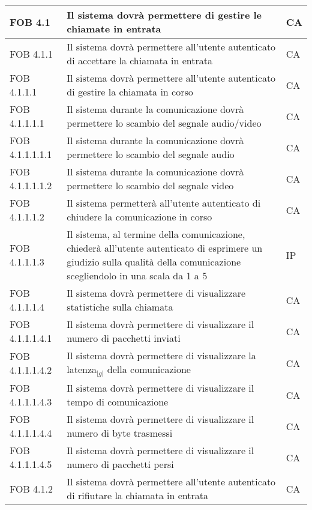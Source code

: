 \begin{longtable}{p{} p{} p{} }
\midrule
FOB 4.1 & Il sistema dovrà permettere di gestire le chiamate in entrata & CA\\

\midrule
FOB 4.1.1 & Il sistema dovrà permettere all'utente autenticato di accettare la chiamata in entrata & CA\\
\midrule
FOB 4.1.1.1 & Il sistema dovrà permettere all'utente autenticato di gestire la chiamata in corso & CA\\

\midrule
FOB 4.1.1.1.1 & Il sistema durante la comunicazione dovrà permettere lo scambio del segnale audio/video & CA\\
\midrule
FOB 4.1.1.1.1.1 & Il sistema durante la comunicazione dovrà permettere lo scambio del segnale audio & CA\\
\midrule
FOB 4.1.1.1.1.2 & Il sistema durante la comunicazione dovrà permettere lo scambio del segnale video & CA\\

\midrule
FOB 4.1.1.1.2 & Il sistema permetterà all'utente autenticato di chiudere la comunicazione in corso & CA\\

\midrule
FOB 4.1.1.1.3 & Il sistema, al termine della comunicazione, chiederà all'utente autenticato di esprimere un giudizio sulla qualità della comunicazione scegliendolo in una scala da 1 a 5 & IP\\

\midrule
FOB 4.1.1.1.4 & Il sistema dovrà permettere di visualizzare statistiche sulla chiamata & CA\\
\midrule
FOB 4.1.1.1.4.1 & Il sistema dovrà permettere di visualizzare il numero di pacchetti inviati & CA\\
\midrule
FOB 4.1.1.1.4.2 & Il sistema dovrà permettere di visualizzare la latenza$_{|g|}$ della comunicazione & CA\\
\midrule
FOB 4.1.1.1.4.3 & Il sistema dovrà permettere di visualizzare il tempo di comunicazione & CA\\
\midrule
FOB 4.1.1.1.4.4 & Il sistema dovrà permettere di visualizzare il numero di byte trasmessi & CA\\
\midrule
FOB 4.1.1.1.4.5 & Il sistema dovrà permettere di visualizzare il numero di pacchetti persi & CA\\

\midrule
FOB 4.1.2 & Il sistema dovrà permettere all'utente autenticato di rifiutare la chiamata in entrata & CA\\


\end{longtable}
